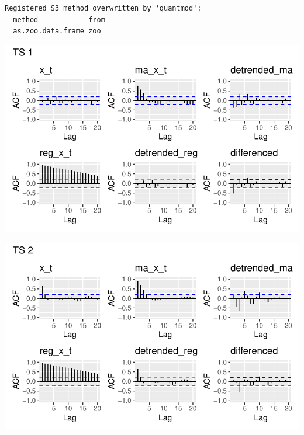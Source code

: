 \documentclass[
  letterpaper,
  DIV=11,
  numbers=noendperiod]{scrartcl}
\newenvironment{Shaded}{\begin{snugshade}}{\end{snugshade}}
\newcommand{\AttributeTok}[1]{\textcolor[rgb]{0.40,0.45,0.13}{#1}}
\newcommand{\FunctionTok}[1]{\textcolor[rgb]{0.28,0.35,0.67}{#1}}
\newcommand{\NormalTok}[1]{\textcolor[rgb]{0.00,0.23,0.31}{#1}}
\newcommand{\SpecialCharTok}[1]{\textcolor[rgb]{0.37,0.37,0.37}{#1}}
\newcommand{\StringTok}[1]{\textcolor[rgb]{0.13,0.47,0.30}{#1}}
\begin{document}
\begin{verbatim}
Registered S3 method overwritten by 'quantmod':
  method            from
  as.zoo.data.frame zoo 
\end{verbatim}

\includegraphics{Lecture7_files/figure-pdf/unnamed-chunk-22-1.pdf}

\begin{Shaded}
\end{Shaded}

\includegraphics{Lecture7_files/figure-pdf/unnamed-chunk-22-2.pdf}

\begin{Shaded}
\end{Shaded}
\end{document}
